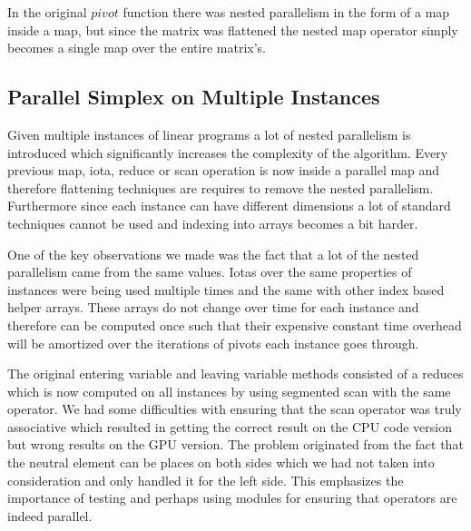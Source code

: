 In the original $pivot$ function there was nested parallelism in the form of a map inside a map, but since the matrix was flattened the nested map operator simply becomes a single map over the entire matrix's. 

\subsection{Parallel Simplex on Multiple Instances}
Given multiple instances of linear programs a lot of nested parallelism is introduced which significantly increases the complexity of the algorithm. Every previous map, iota, reduce or scan operation is now inside a parallel map and therefore flattening techniques are requires to remove the nested parallelism. Furthermore since each instance can have different dimensions a lot of standard techniques cannot be used and indexing into arrays becomes a bit harder. 

One of the key observations we made was the fact that a lot of the nested parallelism came from the same values. Iotas over the same properties of instances were being used multiple times and the same with other index based helper arrays. These arrays do not change over time for each instance and therefore can be computed once such that their expensive constant time overhead will be amortized over the iterations of pivots each instance goes through. 

The original entering variable and leaving variable methods consisted of a reduces which is now computed on all instances by using segmented scan with the same operator. We had some difficulties with ensuring that the scan operator was truly associative which resulted in getting the correct result on the CPU code version but wrong results on the GPU version. The problem originated from the fact that the neutral element can be places on both sides which we had not taken into consideration and only handled it for the left side. This emphasizes the importance of testing and perhaps using modules for ensuring that operators are indeed parallel.  
